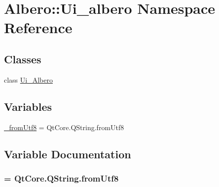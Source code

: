 \hypertarget{namespaceAlbero_1_1Ui__albero}{
\section{Albero::Ui\_\-albero Namespace Reference}
\label{namespaceAlbero_1_1Ui__albero}
}
\subsection*{Classes}
\begin{DoxyCompactItemize}
\item 
class \hyperlink{classAlbero_1_1Ui__albero_1_1Ui__Albero}{Ui\_\-Albero}
\end{DoxyCompactItemize}
\subsection*{Variables}
\begin{DoxyCompactItemize}
\item 
\hyperlink{namespaceAlbero_1_1Ui__albero_adcdc88b478e3ac15818e6c12442c95c0}{\_\-fromUtf8} = QtCore.QString.fromUtf8
\end{DoxyCompactItemize}


\subsection{Variable Documentation}
\hypertarget{namespaceAlbero_1_1Ui__albero_adcdc88b478e3ac15818e6c12442c95c0}{
\subsubsection[{\_\-fromUtf8}]{ = QtCore.QString.fromUtf8}}
\label{namespaceAlbero_1_1Ui__albero_adcdc88b478e3ac15818e6c12442c95c0}
